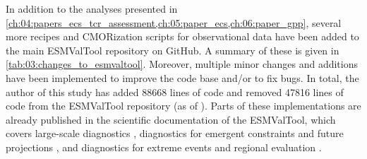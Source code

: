 In addition to the analyses presented in
\cref{ch:04:papers_ecs_tcr_assessment,ch:05:paper_ecs,ch:06:paper_gpp}, several
more recipes and \acs{CMOR}ization scripts for observational data have been
added to the main \ac{ESMValTool} repository on GitHub. A summary of these is
given in \cref{tab:03:changes_to_esmvaltool}. Moreover, multiple minor changes
and additions have been implemented to improve the code base and/or to fix
bugs. In total, the author of this study has added 88668 lines of code and
removed 47816 lines of code from the \ac{ESMValTool} repository (as of
\TheMonth{}). Parts of these implementations are already published in the
scientific documentation of the \ac{ESMValTool}, which covers large-scale
diagnostics \autocite{Eyring2020}, diagnostics for emergent constraints and
future projections \autocite{Lauer2020}, and diagnostics for extreme events and
regional evaluation \autocite{Weigel2020}.

